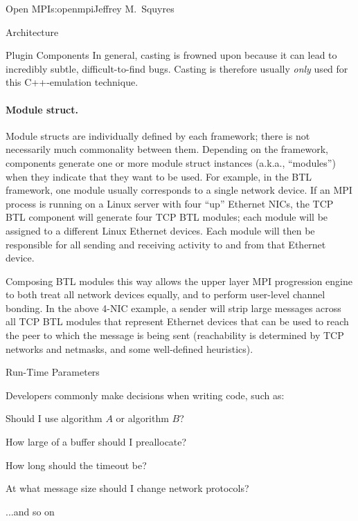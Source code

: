 \begin{aosachapter}{Open MPI}{s:openmpi}{Jeffrey M.\ Squyres}
\begin{aosasect1}{Architecture}
\begin{aosasect2}{Plugin Components}
In general, casting is frowned upon because it can lead to incredibly
subtle, difficult-to-find bugs.  Casting is therefore usually {\em
  only} used for this C++-emulation technique.


\paragraph{Module struct.}

Module structs are individually defined by each framework; there is
not necessarily much commonality between them.
%
Depending on the framework, components generate one or more module
struct instances (a.k.a., ``modules'') when they indicate that they
want to be used.
%
For example, in the BTL framework, one module usually corresponds to a
single network device.  
%
If an MPI process is running on a Linux server with four ``up''
Ethernet NICs, the TCP BTL component will generate four TCP BTL
modules; each module will be assigned to a different Linux Ethernet
devices.
%
Each module will then be responsible for all sending and receiving
activity to and from that Ethernet device.

Composing BTL modules this way allows the upper layer MPI progression
engine to both treat all network devices equally, and to perform
user-level channel bonding.  
%
In the above 4-NIC example, a sender will strip large messages across
all TCP BTL modules that represent Ethernet devices that can be used
to reach the peer to which the message is being sent (reachability is
determined by TCP networks and netmasks, and some well-defined
heuristics).

\end{aosasect2}


\begin{aosasect2}{Run-Time Parameters}

Developers commonly make decisions when writing code, such as:

\begin{aosaitemize}
\item Should I use algorithm $A$ or algorithm $B$?
\item How large of a buffer should I preallocate?
\item How long should the timeout be?
\item At what message size should I change network protocols?
\item ...and so on
\end{aosaitemize}


\end{aosasect2}
\end{aosasect1}
\end{aosachapter}
